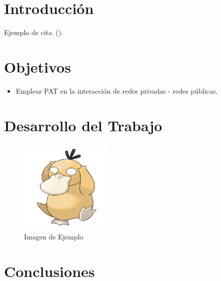 \setcounter{page}{1}

\section{Introducción}
    Ejemplo de cita~(\cite{buffett84}).
\section{Objetivos}
    \begin{itemize}
        \item Emplear PAT en la interacción de redes privadas - redes públicas.
    \end{itemize}

\section{Desarrollo del Trabajo}

    \begin{figure}[H]
        \centering
        \includegraphics[width=0.4\textwidth]{img/prueba.png}
        \caption{Imagen de Ejemplo}
        \label{fig:Imagen_Ejemplo}
    \end{figure}


\section{Conclusiones}

